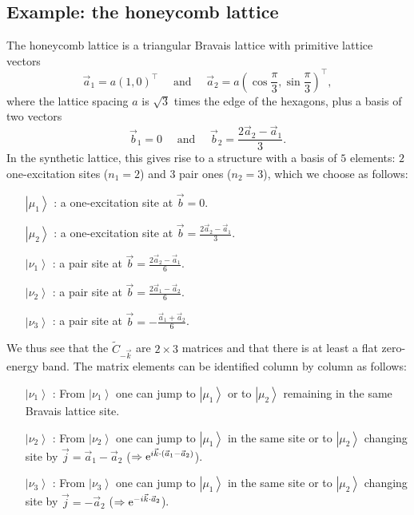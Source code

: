 \documentclass[prl,aps,twocolumn,showpacs,superscriptaddress,longbibliography]{revtex4-1}
\newcommand{\be}{\begin{equation}}
\newcommand{\ee}{\end{equation}}
\newcommand{\rme}[1]{{\rm{e}}^{#1}}
\newcommand{\mand}{\quad\text{ and }\quad}
\newcommand{\wt}{\widetilde}
\newcommand{\lt}{\left(}
\newcommand{\rt}{\right)}
\newcommand{\ran}{\right\rangle}
\newcommand{\ket}[1]{\left| #1 \ran}
\begin{document}


\subsection{Example: the honeycomb lattice}

The honeycomb lattice is a triangular Bravais lattice with primitive lattice vectors
\be
	\vec{a}_1 = a \lt 1,0   \rt^\intercal \mand \vec{a}_2 = a \lt \cos \frac{\pi}{3}, \sin \frac{\pi}{3}   \rt^\intercal ,
\ee
where the lattice spacing $a$ is $\sqrt{3}$ times the edge of the hexagons, plus a basis of two vectors
\be
	\vec{b}_1 = 0 \mand \vec{b}_2 = \frac{2\vec{a}_2 - \vec{a}_1}{3}. 
\ee
In the synthetic lattice, this gives rise to a structure with a basis of $5$ elements: $2$ one-excitation sites ($n_1 = 2$) and $3$ pair ones ($n_2 = 3$), which we choose as follows:
\begin{itemize}
	\item[$\ket{\mu_1}$]: a one-excitation site at $\vec{b} = 0$.
	\item[$\ket{\mu_2}$]: a one-excitation site at $\vec{b} = \frac{2\vec{a}_2 - \vec{a}_1}{3}$.
	\item[$\ket{\nu_1}$]: a pair site at $\vec{b} = \frac{2\vec{a}_2 - \vec{a}_1}{6}$.
	\item[$\ket{\nu_2}$]: a pair site at $\vec{b} = \frac{2\vec{a}_1 - \vec{a}_2}{6}$.
	\item[$\ket{\nu_3}$]: a pair site at $\vec{b} = -\frac{\vec{a}_1 + \vec{a}_2}{6}$.
\end{itemize}
We thus see that the $\wt{C}_{-\vec{k}}$ are $2\times 3$ matrices and that there is at least a flat zero-energy band. The matrix elements can be identified column by column as follows:
\begin{itemize}
	\item[$\ket{\nu_1}$]: From $\ket{\nu_1}$ one can jump to $\ket{\mu_1}$ or to $\ket{\mu_2}$ remaining in the same Bravais lattice site.
	\item[$\ket{\nu_2}$]: From $\ket{\nu_2}$ one can jump to $\ket{\mu_1}$ in the same site or to $\ket{\mu_2}$ changing site by $\vec{j} = \vec{a}_1 - \vec{a}_2$ ($\Rightarrow \rme{i\vec{k}\cdot (\vec{a}_1 - \vec{a}_2) }$).
	\item[$\ket{\nu_3}$]: From $\ket{\nu_3}$ one can jump to $\ket{\mu_1}$ in the same site or to $\ket{\mu_2}$ changing site by $\vec{j} = - \vec{a}_2$ ($\Rightarrow \rme{- i\vec{k} \cdot \vec{a}_2}$).
\end{itemize}
\end{document}
